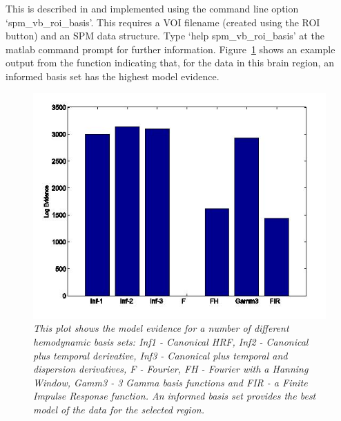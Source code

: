 This is described in \cite{will_bayes_srglm} and implemented using the command line option `spm\_vb\_roi\_basis'. This requires a VOI filename (created using the ROI button) and an SPM data structure. Type `help spm\_vb\_roi\_basis' at the matlab command prompt for further information. Figure~\ref{basis} shows an example output from the function indicating that, for the data in this brain region, an informed basis set has the highest model evidence.

\begin{figure}
\begin{center}
\includegraphics[width=150mm]{fmri_est/basis}
\end{center}
\caption{\em This plot shows the model evidence for a number of different hemodynamic basis sets: Inf1 - Canonical HRF, Inf2 - Canonical plus temporal derivative, Inf3 - Canonical plus temporal and dispersion derivatives, F - Fourier, FH - Fourier with a Hanning Window, Gamm3 - 3 Gamma basis functions and FIR - a Finite Impulse Response function. An informed basis set provides the best model of the data for the selected region.  \label{basis}}
\end{figure}

